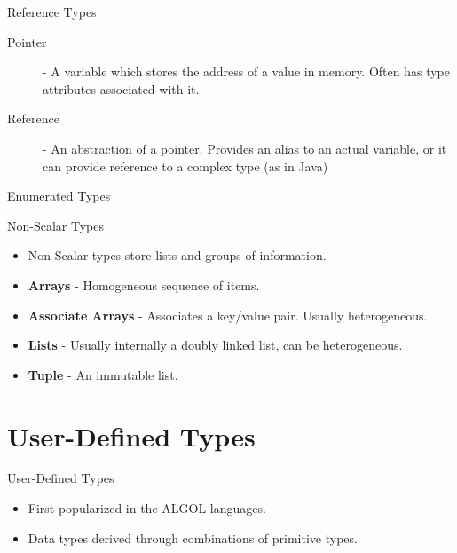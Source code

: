 \documentclass[handout]{beamer}
\newenvironment{code}{%
 \VerbatimEnvironment
 \begin{adjustbox}{max width=\textwidth, max height=0.7\textheight}
 \begin{BVerbatim}
  }{
  \end{BVerbatim}
 \end{adjustbox}
}
\begin{document}
\begin{frame}{Reference Types}
    \begin{description}
        \item[Pointer] - A variable which stores the address of a value in memory. Often has type attributes associated with it.
        \item[Reference] - An abstraction of a pointer. Provides an alias to an actual variable, or it can provide reference to a complex type (as in Java)
    \end{description}
\end{frame}

\begin{frame}[fragile]{Enumerated Types}
\end{frame}

\begin{frame}{Non-Scalar Types}
    \begin{itemize}
        \item Non-Scalar types store lists and groups of information.
        \item \textbf{Arrays} - Homogeneous sequence of items.
        \item \textbf{Associate Arrays} - Associates a key/value pair. Usually heterogeneous.
        \item \textbf{Lists} - Usually internally a doubly linked list, can be heterogeneous.
        \item \textbf{Tuple} - An immutable list.
    \end{itemize}
\end{frame}

\section{User-Defined Types}
\begin{frame}{User-Defined Types}
    \begin{itemize}
        \item First popularized in the ALGOL languages.
        \item Data types derived through combinations of primitive types.
    \end{itemize}
\end{frame}
\end{document}
